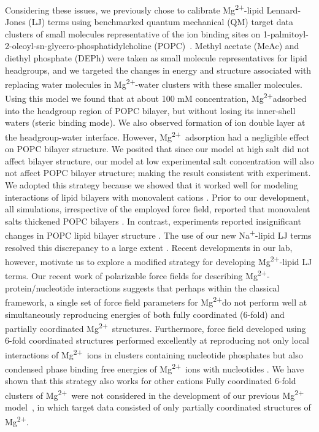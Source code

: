 \documentclass[journal=langd5,manuscript=article]{achemso}
\newcommand{\na}{Na\textsuperscript{+}}
\newcommand{\mg}{Mg\textsuperscript{2+}}
\begin{document}
Considering these issues, we previously chose to calibrate \mg-lipid Lennard-Jones (LJ) terms using 
benchmarked quantum mechanical (QM) target data clusters of small molecules representative of the
ion binding sites on 1-palmitoyl-2-oleoyl-sn-glycero-phosphatidylcholine (POPC)~\cite{saunders:2022}. 
Methyl acetate (MeAc) and diethyl phosphate (DEPh) were taken as small molecule representatives for lipid headgroups, 
and we targeted the changes in energy and structure associated with replacing water molecules in \mg-water clusters with these smaller molecules.  
Using this model we found that at about 100 mM concentration, \mg adsorbed into the headgroup region of POPC bilayer, 
but without losing its inner-shell waters (steric binding mode). We also observed formation of ion double layer at the headgroup-water interface.
However, \mg~adsorption had a negligible effect on POPC bilayer structure. We posited that since our model at 
high salt did not affect bilayer structure, our model at low experimental salt concentration will also not affect POPC bilayer structure; making the result consistent with experiment. 
We adopted this strategy because we showed that it worked well for modeling interactions of lipid bilayers with monovalent cations \cite{saunders:2022}. Prior to our development, all simulations, irrespective of the employed force field, reported that monovalent salts thickened POPC bilayers \cite{sachs:2004,melcr:2018,jurkiewicz:2012,kruczek:2017}. 
In contrast, experiments reported insignificant changes in POPC lipid bilayer structure \cite{pabst:2007:rigidification,petrache:2006:swelling}. 
The use of our new \na-lipid LJ terms resolved this discrepancy to a large extent \cite{saunders:2022}. 
Recent developments in our lab, however, motivate us to explore a modified strategy for developing \mg-lipid LJ terms. 
Our recent work of polarizable force fields for describing \mg-protein/nucleotide interactions \cite{julian:2023:mg} suggests that perhaps within the classical framework, a single set of force field parameters for \mg do not perform well at simultaneously reproducing 
energies of both fully coordinated (6-fold)
and partially coordinated \mg~structures. 
Furthermore, force field developed using 6-fold coordinated structures performed excellently at reproducing not only local interactions of 
\mg~ions in clusters containing nucleotide phosphates but also condensed phase binding free energies of \mg~ions with nucleotides \cite{julian:2023:mg}. We have shown that this strategy also works for other cations \cite{JACS2025} 
Fully coordinated 6-fold clusters of \mg~were not considered in the development of our previous \mg{} model~\cite{saunders:2024}, in which target data consisted of only partially coordinated structures of \mg.
\end{document}

